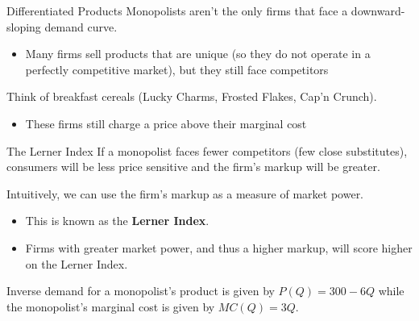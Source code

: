 \documentclass[11pt,t]{beamer}
\begin{document}
\begin{frame}{Differentiated Products}
  Monopolists aren't the only firms that face a downward-sloping demand curve.

  \begin{itemize}
    \item Many firms sell products that are unique (so they do not operate in a perfectly competitive market), but they still face competitors
  \end{itemize}

  \bigskip
  Think of breakfast cereals (Lucky Charms, Frosted Flakes, Cap'n Crunch).

  \begin{itemize}
    \item These firms still charge a price above their marginal cost
  \end{itemize}
\end{frame}

\begin{frame}{The Lerner Index}
  If a monopolist faces fewer competitors (few close substitutes), consumers will be less price sensitive and the firm's markup will be greater.

  \bigskip\pause
  Intuitively, we can use the firm's markup as a measure of market power.

  \begin{itemize}
    \item This is known as the \textbf{Lerner Index}.
    
    \item Firms with greater market power, and thus a higher markup, will score higher on the Lerner Index.
  \end{itemize}

\end{frame}

\begin{frame}{}
  Inverse demand for a monopolist's product is given by $P(Q) = 300-6Q$ while the monopolist's marginal cost is given by $MC(Q) = 3Q$. 
  
\end{frame}

\end{document}
